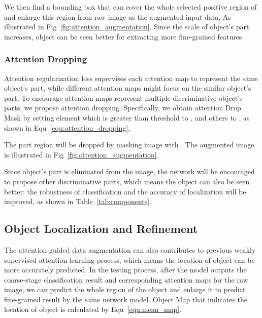 \documentclass[10pt,twocolumn,letterpaper]{article}
\begin{document}
We then find a bounding box  that can cover the whole selected positive region of  and enlarge this region from raw image as the augmented input data, As illustrated in Fig~\ref{fig:attention_augmentation}. Since the scale of object's part increases, object can be seen better for extracting more fine-grained features.

\subsubsection{Attention Dropping}
Attention regularization loss supervises each attention map  to represent the same  object's part, while different attention maps might focus on the similar object's part. To encourage attention maps represent multiple discriminative object's parts, we propose attention dropping. Specifically, we obtain attention Drop Mask  by setting element  which is greater than threshold  to , and others to , as shown in Equ~\ref{equ:attention_dropping},

The  part region will be dropped by masking image  with . The augmented image is illustrated in Fig~\ref{fig:attention_augmentation}.

Since  object's part is eliminated from the image, the network will be encouraged to propose other discriminative parts, which means the object can also be seen better: the robustness of classification and the accuracy of localization will be improved, as shown in Table~\ref{tab:components}.





\subsection{Object Localization and Refinement}
The attention-guided data augmentation can also contributes to previous weakly supervised attention learning process, which means the location of object can be more accurately predicted. In the testing process, after the model outputs the coarse-stage classification result and corresponding attention maps for the raw image, we can predict the whole region of the object and enlarge it to predict fine-grained result by the same network model. Object Map  that indicates the location of object is calculated by Equ~\ref{equ:mean_map}.
\end{document}
